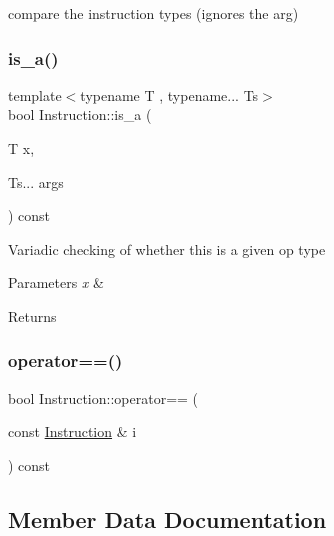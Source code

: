 compare the instruction types (ignores the arg) 

\mbox{\label{class_instruction_ae670ee58f9acdfd60b7213f77dfca794}} 
\subsubsection{\texorpdfstring{is\+\_\+a()}{is\_a()}\hspace{0.1cm}{\footnotesize\ttfamily [2/2]}}
{\footnotesize\ttfamily template$<$typename T , typename... Ts$>$ \\
bool Instruction\+::is\+\_\+a (\begin{DoxyParamCaption}\item[{T}]{x,  }\item[{Ts...}]{args }\end{DoxyParamCaption}) const\hspace{0.3cm}{\ttfamily [inline]}}

Variadic checking of whether this is a given op type 
\begin{DoxyParams}{Parameters}
{\em x} & \\
\hline
\end{DoxyParams}
\begin{DoxyReturn}{Returns}

\end{DoxyReturn}
\mbox{\label{class_instruction_a75e0ecee9ec917bcc47488a1fbeb6a24}} 
\subsubsection{\texorpdfstring{operator==()}{operator==()}}
{\footnotesize\ttfamily bool Instruction\+::operator== (\begin{DoxyParamCaption}\item[{const \hyperlink{class_instruction}{Instruction} \&}]{i }\end{DoxyParamCaption}) const\hspace{0.3cm}{\ttfamily [inline]}}



\subsection{Member Data Documentation}
\mbox{\label{class_instruction_a7ed399e29ec58e97a7b6311919f5d5ca}} 

